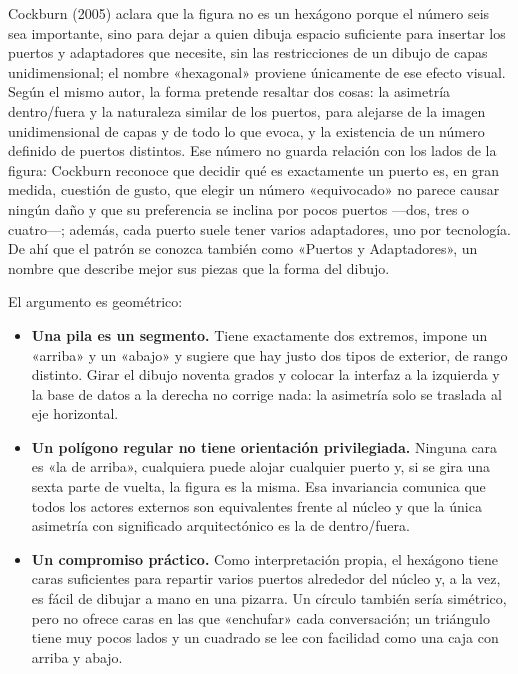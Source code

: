 \documentclass[11pt,a4paper]{article}
\begin{document}
Cockburn (2005) aclara que la figura no es un hexágono porque el número seis sea importante,
sino para dejar a quien dibuja espacio suficiente para insertar los puertos y adaptadores que
necesite, sin las restricciones de un dibujo de capas unidimensional; el nombre
«hexagonal» proviene únicamente de ese efecto visual. Según el mismo autor, la forma pretende
resaltar dos cosas: la asimetría dentro/fuera y la naturaleza similar de los puertos, para
alejarse de la imagen unidimensional de capas y de todo lo que evoca, y la existencia de un
número definido de puertos distintos. Ese número no guarda relación con los lados de la
figura: Cockburn reconoce que decidir qué es exactamente un puerto es, en gran medida, cuestión
de gusto, que elegir un número «equivocado» no parece causar ningún daño y que su preferencia
se inclina por pocos puertos ---dos, tres o cuatro---; además, cada puerto suele tener varios
adaptadores, uno por tecnología. De ahí que el patrón se conozca también como «Puertos y
Adaptadores», un nombre que describe mejor sus piezas que la forma del dibujo.

El argumento es geométrico:

\begin{itemize}[leftmargin=1.4em]
\item \textbf{Una pila es un segmento.} Tiene exactamente dos extremos, impone un «arriba» y un
«abajo» y sugiere que hay justo dos tipos de exterior, de rango distinto. Girar el dibujo
noventa grados y colocar la interfaz a la izquierda y la base de datos a la derecha no corrige
nada: la asimetría solo se traslada al eje horizontal.
\item \textbf{Un polígono regular no tiene orientación privilegiada.} Ninguna cara es «la de
arriba», cualquiera puede alojar cualquier puerto y, si se gira una sexta parte de vuelta, la
figura es la misma. Esa invariancia comunica que todos los actores externos son equivalentes
frente al núcleo y que la única asimetría con significado arquitectónico es la de
dentro/fuera.
\item \textbf{Un compromiso práctico.} Como interpretación propia, el hexágono tiene caras
suficientes para repartir varios puertos alrededor del núcleo y, a la vez, es fácil de dibujar
a mano en una pizarra. Un círculo también sería simétrico, pero no ofrece caras en las que
«enchufar» cada conversación; un triángulo tiene muy pocos lados y un cuadrado se lee con
facilidad como una caja con arriba y abajo.
\end{itemize}
\end{document}
